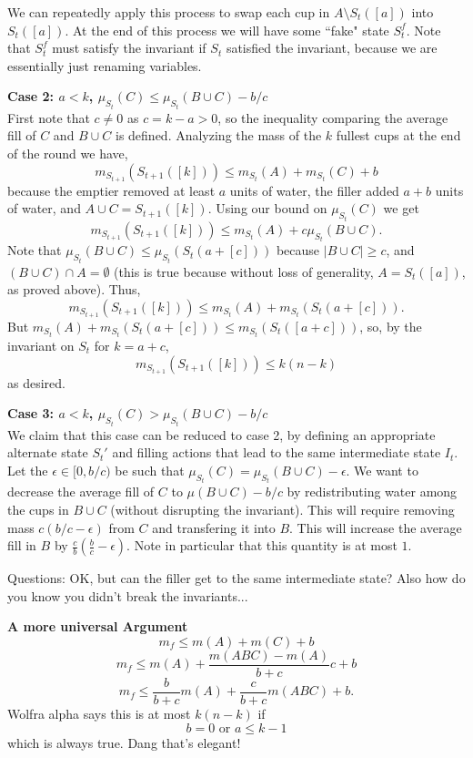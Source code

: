 \documentclass[twocolumn]{article}[11pt]
\begin{document}
We can repeatedly apply this process to swap each cup in $A\setminus S_t([a])$ into $S_t([a])$.
At the end of this process we will have some ``fake" state $S_t^f$. Note that
$S_t^f$ must satisfy the invariant if $S_t$ satisfied the invariant, because we
are essentially just renaming variables.


\textbf{Case 2: $a<k$, $\mu_{S_t}(C) \le \mu_{S_t}(B\cup C) - b/c$}\\
First note that $c \neq 0$ as $c=k-a > 0$, so the inequality comparing the
average fill of $C$ and $B\cup C$ is defined.
Analyzing the mass of the $k$ fullest cups at the end of the round we have,
$$m_{S_{t+1}}(S_{t+1}([k])) \le m_{S_t}(A) + m_{S_t}(C) + b$$
because the emptier removed at least $a$ units of water, the filler added
$a+b$ units of water, and $A \cup C = S_{t+1}([k])$.
Using our bound on $\mu_{S_t}(C)$ we get
$$m_{S_{t+1}}(S_{t+1}([k])) \le m_{S_t}(A) + c\mu_{S_t}(B\cup C).$$
Note that $\mu_{S_t}(B\cup C) \le \mu_{S_t}(S_t(a+[c]))$ because $|B\cup C| \ge
c$, and $(B\cup C) \cap A = \emptyset$ (this is true because without loss of
generality, $A = S_t([a])$, as proved above).
Thus, $$m_{S_{t+1}}(S_{t+1}([k])) \le m_{S_t}(A) + m_{S_t}(S_t(a+[c])).$$
But $m_{S_t}(A) + m_{S_t}(S_t(a+[c])) \le m_{S_t}(S_t([a+c]))$, so, by the invariant on $S_t$ for $k=a+c$, 
$$m_{S_{t+1}}(S_{t+1}([k])) \le k(n-k)$$
as desired.

\textbf{Case 3: $a<k$, $\mu_{S_t}(C) > \mu_{S_t}(B\cup C) - b/c$}\\
We claim that this case can be reduced to case 2, by defining an appropriate
alternate state $S_t'$ and filling actions that lead to the same intermediate
state $I_t$.
Let the $\epsilon \in [0, b/c)$ be such that $\mu_{S_t}(C) = \mu_{S_t}(B\cup C) - \epsilon$.
We want to decrease the average fill of $C$ to $\mu(B\cup C) - b/c$ by
redistributing water among the cups in $B\cup C$ (without disrupting the invariant).
This will require removing mass $c(b/c - \epsilon)$ from $C$ and transfering it into $B$.
This will increase the average fill in $B$ by $\frac{c}{b}\left(\frac{b}{c} -
\epsilon\right)$. Note in particular that this quantity is at most $1$.

{\color{red} Questions: OK, but can the filler get to the same intermediate state? Also how
do you know you didn't break the invariants...}

\textbf{A more universal Argument}
$$m_f \le m(A) + m(C) + b$$
$$m_f \le m(A) + \frac{m(ABC) - m(A)}{b+c}c + b$$
$$m_f \le \frac{b}{b+c}m(A) + \frac{c}{b+c}m(ABC) + b.$$
Wolfra alpha says this is at most $k(n-k)$ if
$$b=0 \text{ or } a \le k-1$$ 
which is always true.
Dang that's elegant!
\end{document}
